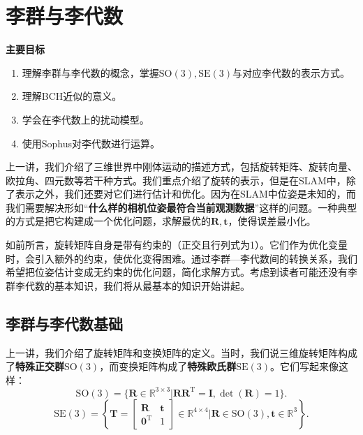 \chapter{李群与李代数}
\label{cpt:4}
\begin{mdframed}  
	\textbf{主要目标}
	\begin{enumerate}[labelindent=0em,leftmargin=1.5em]
		\item 理解李群与李代数的概念，掌握$\mathrm{SO}(3), \mathrm{SE}(3)$与对应李代数的表示方式。
		\item 理解BCH近似的意义。
		\item 学会在李代数上的扰动模型。
		\item 使用Sophus对李代数进行运算。
	\end{enumerate}
\end{mdframed} 

上一讲，我们介绍了三维世界中刚体运动的描述方式，包括旋转矩阵、旋转向量、欧拉角、四元数等若干种方式。我们重点介绍了旋转的表示，但是在SLAM中，除了表示之外，我们还要对它们进行估计和优化。因为在SLAM中位姿是未知的，而我们需要解决形如“\textbf{什么样的相机位姿最符合当前观测数据}”这样的问题。一种典型的方式是把它构建成一个优化问题，求解最优的$\bm{R}, \bm{t}$，使得误差最小化。

如前所言，旋转矩阵自身是带有约束的（正交且行列式为1）。它们作为优化变量时，会引入额外的约束，使优化变得困难。通过李群—李代数间的转换关系，我们希望把位姿估计变成无约束的优化问题，简化求解方式。考虑到读者可能还没有李群李代数的基本知识，我们将从最基本的知识开始讲起。
\newpage


\newpage 
\section{李群与李代数基础}
上一讲，我们介绍了旋转矩阵和变换矩阵的定义。当时，我们说三维旋转矩阵构成了\textbf{特殊正交群}$\mathrm{SO}(3)$，而变换矩阵构成了\textbf{特殊欧氏群}$\mathrm{SE}(3)$。它们写起来像这样：
\begin{equation}
\mathrm{SO}(3) = \{ \bm{R} \in \mathbb{R}^{3 \times 3} | \bm{R R}^\mathrm{T} = \bm{I}, \det(\bm{R})=1 \}.
\end{equation}
\begin{equation}
\mathrm{SE}(3) = \left\{ \bm{T} = \left[ {\begin{array}{*{20}{c}}
	\bm{R} & \bm{t} \\
	{{\bm{0}^\mathrm{T}}} & 1
	\end{array}} \right]
\in \mathbb{R}^{4 \times 4} | \bm{R} \in \mathrm{SO}(3), \bm{t} \in \mathbb{R}^3\right\}.
\end{equation}

